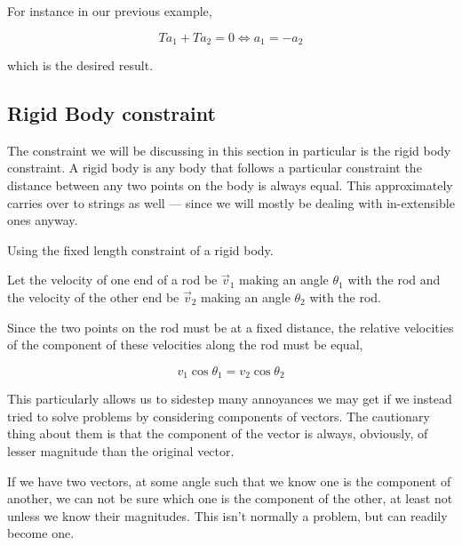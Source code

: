 For instance in our previous example,

\begin{equation*}
    Ta_1 + Ta_2 = 0 \iff a_1 = -a_2
\end{equation*}

which is the desired result.

\subsection{Rigid Body constraint}

The constraint we will be discussing in this section in particular is the rigid body constraint.
A rigid body is any body that follows a particular constraint the distance between
any two points on the body is always equal. This approximately carries over to 
strings as well --- since we will mostly be dealing with in-extensible ones anyway.

\begin{marginfigure}
    \caption{Using the fixed length constraint of a rigid body.}
\end{marginfigure}

Let the velocity of one end of a rod be \(\vec{v}_1\) making an angle \(\theta_1\) with the rod
and the velocity of the other end be \(\vec{v}_2\) making an angle \(\theta_2\) with the rod.

Since the two points on the rod must be at a fixed distance, the relative velocities of the
 component of these velocities along the rod must be equal,

 \begin{equation}
    \boxed{v_1\cos\theta_1 = v_2\cos\theta_2}
 \end{equation}

This particularly allows us to sidestep many annoyances we may get if we 
instead tried to solve problems by considering components of vectors. The cautionary thing 
about them is that the component of the vector is always, obviously, of lesser magnitude than 
the original vector.

If we have two vectors, at some angle such that we know one is the component of another, we
can not be sure which one is the component of the other, at least not unless we 
know their magnitudes. This isn't normally a problem, but can readily become one.

\newpage

\begin{marginfigure}
    \caption{}
    \label{fig: velconstraintex}
\end{marginfigure}

